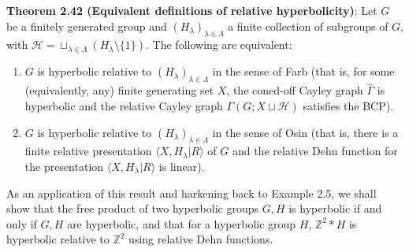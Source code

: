 \documentclass[12pt]{article}
\newcommand{\vs}{\vskip10pt}
\begin{document}
	\vs 
	
	\textbf{Theorem 2.42 (Equivalent definitions of relative hyperbolicity)}: Let $G$ be a finitely generated group and $(H_{\lambda})_{\lambda \in \Lambda}$ a finite collection of subgroups of $G$, with $\mathcal{H} = \sqcup_{\lambda \in \Lambda} (H_{\lambda} \setminus \{1\})$. The following are equivalent: 
	
	\begin{enumerate} [label = (\alph*)]
		\item $G$ is hyperbolic relative to $(H_{\lambda})_{\lambda \in \Lambda}$ in the sense of Farb (that is, for some (equivalently, any) finite generating set $X$, the coned-off Cayley graph $\hat{\Gamma}$ is hyperbolic and the relative Cayley graph $\Gamma(G; X \sqcup \mathcal{H})$ satisfies the BCP). 
		\item $G$ is hyperbolic relative to $(H_{\lambda})_{\lambda \in \Lambda}$ in the sense of Osin (that is, there is a finite relative presentation $\langle X, H_{\lambda} \vert R \rangle$ of $G$ and the relative Dehn function for the presentation $\langle X, H_{\lambda} \vert R \rangle$ is linear).
	\end{enumerate}
	
	\vs
	
	As an application of this result and harkening back to Example 2.5, we shall show that the free product of two hyperbolic groups $G,H$ is hyperbolic if and only if $G,H$ are hyperbolic, and that for a hyperbolic group $H$, $\mathbb{Z}^2 * H$ is hyperbolic relative to $\mathbb{Z}^2$ using relative Dehn functions. 
	
	\vs 
	
\end{document}
